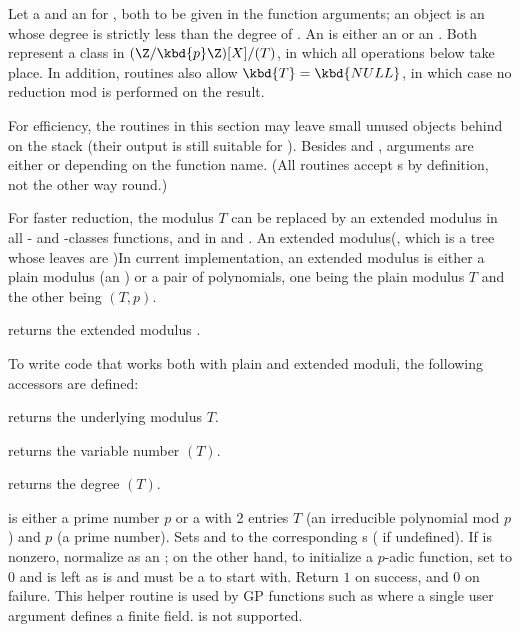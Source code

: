  Let  a  and  an
 for , both to be given in the function arguments; an 
object is an  whose degree is strictly less than the degree of
. An  is either an  or an . Both represent
a class in $(\Z/\kbd{p}\Z)[X] / (T)$, in which all operations below take
place. In addition,  routines also allow $\kbd{T} = \kbd{NULL}$, in
which case no reduction mod  is performed on the result.

For efficiency, the routines in this section may leave small unused objects
behind on the stack (their output is still suitable for ).
Besides  and , arguments are either  or 
depending on the function name. (All  routines accept s by
definition, not the other way round.)


For faster reduction, the modulus $T$ can be replaced by an extended modulus
in all - and -classes functions, and in  and
. An extended modulus(, which is a tree whose leaves are )In
current implementation, an extended modulus is either a plain modulus (an
) or a pair of polynomials, one being the plain modulus $T$ and the
other being $(T,p)$.

 returns the extended modulus .

To write code that works both with plain and extended moduli, the following
accessors are defined:

 returns the underlying modulus $T$.

 returns the variable number $(T)$.

 returns the degree $(T)$.


  is either
a prime number $p$ or a  with 2 entries $T$ (an irreducible
polynomial mod $p$) and $p$ (a prime number). Sets  and 
to the corresponding s ( if undefined). If 
is nonzero, normalize  as an ; on the other hand,
to initialize a $p$-adic function, set  to $0$ and  is left
as is and must be a  to start with. Return $1$ on success, and $0$ on
failure. This helper routine is used by GP functions such as 
where a single user argument defines a finite field.  is not
supported.

